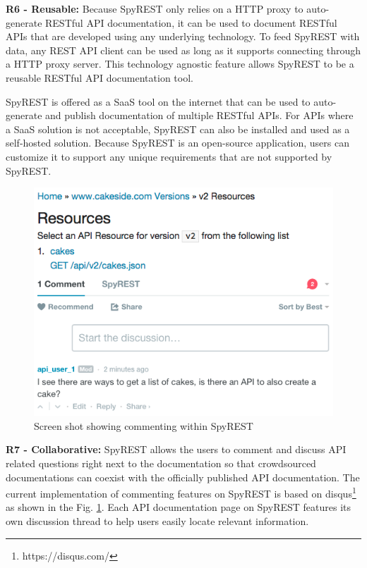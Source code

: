\documentclass[conference]{IEEEtran}
\begin{document}
\textbf{R6 - Reusable:} Because SpyREST only relies on a HTTP proxy to auto-generate RESTful API documentation, it can be used to document RESTful APIs that are developed using any underlying technology. To feed SpyREST with data, any REST API client can be used as long as it supports connecting through a HTTP proxy server. This technology agnostic feature allows SpyREST to be a reusable RESTful API documentation tool.

SpyREST is offered as a SaaS tool on the internet that can be used to auto-generate and publish documentation of multiple RESTful APIs. For APIs where a SaaS solution is not acceptable, SpyREST can also be installed and used as a self-hosted solution. Because SpyREST is an open-source application, users can customize it to support any unique requirements that are not supported by SpyREST.

\begin{figure}[!tbh]
  \centering
  \includegraphics[width=\linewidth]{comments.png}
  \caption{Screen shot showing commenting within SpyREST}
  \label{fig:comments}
\end{figure}


\textbf{R7 - Collaborative:} SpyREST allows the users to comment and discuss API related questions right next to the documentation so that crowdsourced documentations can coexist with the officially published API documentation. The current implementation of commenting features on SpyREST is based on disqus\footnote{https://disqus.com/} as shown in the Fig. \ref{fig:comments}. Each API documentation page on SpyREST features its own discussion thread to help users easily locate relevant information.
\end{document}
